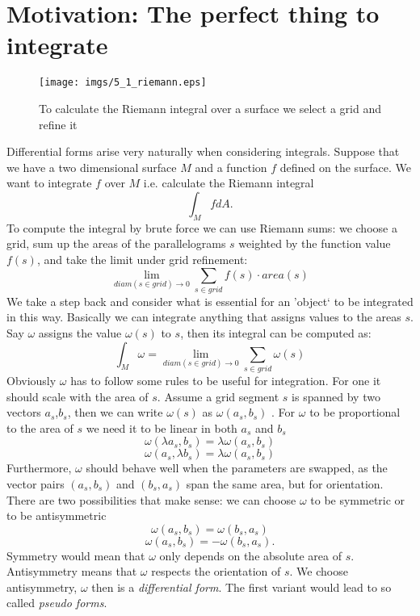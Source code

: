\section{Motivation: The perfect thing to integrate}
\label{sec:dfmotivation}
\begin{figure}
	\begin{center}
	\texttt{[image: imgs/5\_1\_riemann.eps]}
	\end{center}
	\vspace{-1cm}
	\caption{To calculate the Riemann integral over a surface we select a grid and refine it}
	\label{fig:5_1_riemsum}
\end{figure}

Differential forms arise very naturally when considering integrals. Suppose that we have a two dimensional surface $M$ and a function $f$ defined on the surface. We want to integrate $f$ over $M$ i.e. calculate the Riemann integral
\[\int_{M} f dA.\]
To compute the integral by brute force we can use Riemann sums: we choose a grid, sum up the areas of the parallelograms $s$ weighted by the  function value $f(s)$, and take the limit under grid refinement:
\[\lim_{diam(s\in grid)\rightarrow 0} \sum_{s \in grid} f(s)\cdot area(s) \]
We take a step back and consider what is essential for an 'object` to be integrated in this way.
Basically we can integrate anything that assigns values to the areas $s$. Say $\omega$ assigns the value $\omega(s)$ to $s$, then its integral can be computed as:
\[\int_M \omega = \lim_{diam(s\in grid)\rightarrow 0} \sum_{s \in grid} \omega(s)\]
Obviously $\omega$ has to follow some rules to be useful for integration. For one it should scale with the area of $s$. Assume a grid segment $s$ is spanned by two vectors $a_s$,$b_s$, then we can write $\omega(s)$ as $\omega(a_s,b_s)$ . For $\omega$ to be proportional to the area of $s$ we need it to be linear in both $a_s$ and $b_s$
\[\omega(\lambda a_s, b_s) =\lambda \omega(a_s,b_s)\]
\[\omega(a_s , \lambda b_s) =\lambda \omega(a_s,b_s)\]
Furthermore, $\omega$ should behave well when the parameters are swapped, as the vector pairs $(a_s,b_s)$ and $(b_s,a_s)$ span the same area, but for orientation. There are two possibilities that make sense: we can choose $\omega$ to be symmetric or to be antisymmetric
\[\omega(a_s,b_s) = \omega(b_s,a_s)\]
\[\omega(a_s,b_s) = - \omega(b_s,a_s).\]
Symmetry would mean that $\omega$ only depends on the absolute area of $s$. Antisymmetry means that $\omega$ respects the orientation of $s$. We choose antisymmetry, $\omega$ then is a \emph{differential form}. The first variant would lead to so called \emph{pseudo forms}. 

